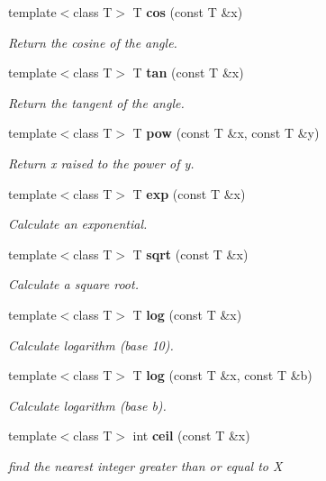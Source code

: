 \begin{CompactItemize}
template$<$class T$>$ T {\bf cos} (const T \&x)
\begin{CompactList}\small\item\em Return the cosine of the angle. \item\end{CompactList}\item 
template$<$class T$>$ T {\bf tan} (const T \&x)
\begin{CompactList}\small\item\em Return the tangent of the angle. \item\end{CompactList}\item 
template$<$class T$>$ T {\bf pow} (const T \&x, const T \&y)
\begin{CompactList}\small\item\em Return x raised to the power of y. \item\end{CompactList}\item 
template$<$class T$>$ T {\bf exp} (const T \&x)
\begin{CompactList}\small\item\em Calculate an exponential. \item\end{CompactList}\item 
template$<$class T$>$ T {\bf sqrt} (const T \&x)
\begin{CompactList}\small\item\em Calculate a square root. \item\end{CompactList}\item 
template$<$class T$>$ T {\bf log} (const T \&x)
\begin{CompactList}\small\item\em Calculate logarithm (base 10). \item\end{CompactList}\item 
template$<$class T$>$ T {\bf log} (const T \&x, const T \&b)
\begin{CompactList}\small\item\em Calculate logarithm (base b). \item\end{CompactList}\item 
template$<$class T$>$ int {\bf ceil} (const T \&x)
\begin{CompactList}\small\item\em find the nearest integer greater than or equal to X \item\end{CompactList}\item 

\end{CompactItemize}
